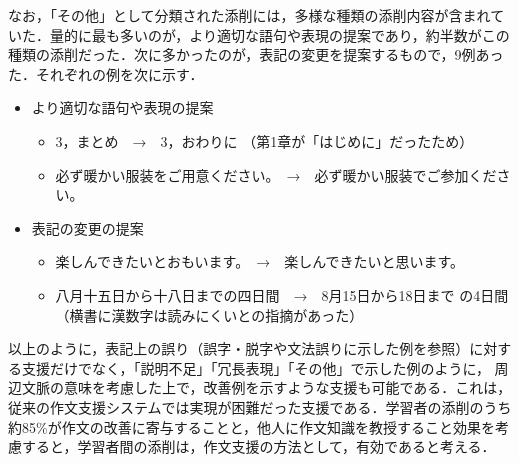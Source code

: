 \documentclass[japanese]{jnlp_1.4}
\begin{document}
なお，「その他」として分類された添削には，多様な種類の添削内容が含まれて
いた．量的に最も多いのが，より適切な語句や表現の提案であり，約半数がこの
種類の添削だった．次に多かったのが，表記の変更を提案するもので，9例あっ
た．それぞれの例を次に示す．


\begin{itemize}
 \item より適切な語句や表現の提案
       \begin{itemize}
	\item 3，まとめ　→　3，おわりに （第1章が「はじめに」だったため）
	\item 必ず暖かい服装をご用意ください。　→　必ず暖かい服装でご参加ください。
       \end{itemize}
 \item 表記の変更の提案
       \begin{itemize}
	\item 楽しんできたいとおもいます。　→　楽しんできたいと思います。
	\item 八月十五日から十八日までの四日間　→　8月15日から18日まで
	      の4日間 （横書に漢数字は読みにくいとの指摘があった）
       \end{itemize}
\end{itemize}

以上のように，表記上の誤り（誤字・脱字や文法誤りに示した例を参照）に対す
る支援だけでなく，「説明不足」「冗長表現」「その他」で示した例のように，
周辺文脈の意味を考慮した上で，改善例を示すような支援も可能である．これは，
従来の作文支援システムでは実現が困難だった支援である．学習者の添削のうち
約85\%が作文の改善に寄与することと，他人に作文知識を教授すること効果を考
慮すると，学習者間の添削は，作文支援の方法として，有効であると考える．
\end{document}
